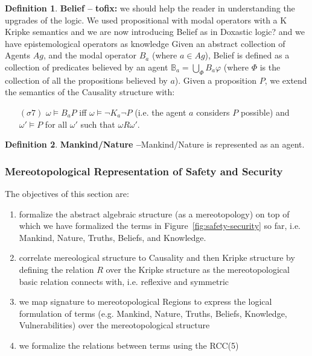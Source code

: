 \documentclass{article}
\newcommand{\fix}[2]{{\color{red} {\bf tofix:} #2}}
\theoremstyle{definition}
\newtheorem{definition}{Definition}[section]
\theoremstyle{corollary}
\theoremstyle{lemma}
\theoremstyle{theorem}
\theoremstyle{theorem}
\newcommand{\modalrelation}{R}
\newcommand{\world}{\omega}
\newcommand{\interpretation}{\sigma}
\newcommand{\knows}[2]{K_{#1}#2}
\newcommand{\belief}[1]{\mathbb{B}_{#1}}
\newcommand{\believe}[2]{B_{#1}#2}
\begin{document}
\begin{definition}{\bf Belief --}\label{def:belief}
	\fix{mr}{we should help the reader in understanding the upgrades of the logic. We used propositional with modal operators with a K Kripke semantics and we are now introducing Belief as in Doxastic logic? and we have epistemological operators as knowledge}
	Given an abstract collection of Agents $Ag$, and the modal operator
	$\believe{a}{}$ (where $a\in Ag$), Belief is defined as a collection
	of predicates believed by an agent $\belief{a}=\bigcup_\Phi \believe{a}{\varphi}$
	(where $\Phi$ is the collection of all the propositions believed by $a$).
	Given a proposition $P$, we extend the semantics of the Causality structure with:
	\begin{enumerate}[noitemsep]
		\item[$(\interpretation7)$] $\world\models\believe{a}{P}$ iff
			$\world\models\neg\knows{a}{\neg P}$ (i.e. the agent $a$ considers $P$ possible) 
			and $\world'\models P$ for all
			$\world'$ such that $\world\modalrelation\world'$.
	\end{enumerate}
\end{definition}

\begin{definition}{\bf Mankind/Nature --}\label{def:mankind-nature}
Mankind/Nature is represented as an agent.  
\end{definition}

\subsubsection{Mereotopological Representation of Safety and Security}\label{sec:formalGlossary}
The objectives of this section are:
\begin{enumerate}[noitemsep]
	\item formalize the abstract algebraic structure (as a mereotopology)
		on top of which we have formalized the terms in
		Figure~\ref{fig:safety-security} so far, i.e. Mankind, Nature,
		Truths, Beliefs, and Knowledge.
	\item correlate mereological structure to Causality and then Kripke
		structure by defining the relation $R$ over the Kripke
		structure as the mereotopological basic relation connects with,
		i.e. reflexive and symmetric
	\item we map signature to mereotopological Regions to express the
		logical formulation of terms (e.g. Mankind, Nature, Truths,
		Beliefs, Knowledge, Vulnerabilities) over the mereotopological
		structure
	\item we formalize the relations between terms using the RCC(5)
\end{enumerate}
\end{document}
